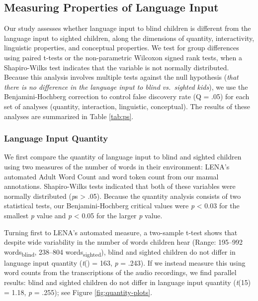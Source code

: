 \documentclass[
  man,floatsintext]{apa6}
\begin{document}
\hypertarget{measuring-properties-of-language-input}{%
\subsection{Measuring Properties of Language Input}\label{measuring-properties-of-language-input}}

Our study assesses whether language input to blind children is different from the language input to sighted children, along the dimensions of quantity, interactivity, linguistic properties, and conceptual properties. We test for group differences using paired t-tests or the non-parametric Wilcoxon signed rank tests, when a Shapiro-Wilks test indicates that the variable is not normally distributed. Because this analysis involves multiple tests against the null hypothesis (\emph{that there is no difference in the language input to blind vs.~sighted kids}), we use the Benjamini-Hochberg correction to control false discovery rate (Q = .05) for each set of analyses (quantity, interaction, linguistic, conceptual). The results of these analyses are summarized in Table \ref{tab:ps}.

\hypertarget{language-input-quantity}{%
\subsubsection{Language Input Quantity}\label{language-input-quantity}}

We first compare the quantity of language input to blind and sighted children using two measures of the number of words in their environment: LENA's automated Adult Word Count and word token count from our manual annotations. Shapiro-Wilks tests indicated that both of these variables were normally distributed (\emph{p}s \textgreater{} .05). Because the quantity analysis consists of two statistical tests, our Benjamini-Hochberg critical values were \emph{p} \textless{} 0.03 for the smallest \emph{p} value and \emph{p} \textless{} 0.05 for the larger \emph{p} value.

Turning first to LENA's automated measure, a two-sample t-test shows that despite wide variability in the number of words children hear (Range: 195--992 words\textsubscript{blind}, 238--804 words\textsubscript{sighted}), blind and sighted children do not differ in language input quantity (\emph{t}() = 163, \emph{p} = .243). If we instead measure this using word counts from the transcriptions of the audio recordings, we find parallel results: blind and sighted children do not differ in language input quantity (\emph{t}(15) = 1.18, \emph{p} = .255); see Figure \ref{fig:quantity-plots}.
\end{document}
